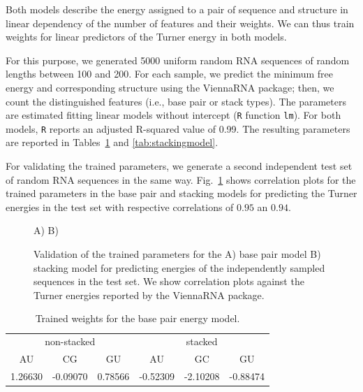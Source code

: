 \documentclass[10pt]{article}
\makeatletter
\newlength{\@aligneps}
\newcommand{\includegraphicstop}[2][]{%
\sbox{\@alignepsbox}{\texttt{[image: \#2]}}%
\setlength{\@aligneps}{-\ht\@alignepsbox}%
\addtolength{\@aligneps}{2ex}%
\raisebox{\@aligneps}{\usebox{\@alignepsbox}}}
\makeatother
\begin{document}
Both models describe the energy assigned to a pair of sequence and
structure in linear dependency of the number of features and their
weights. We can thus train weights for linear predictors of the Turner
energy in both models.

For this purpose, we generated 5000 uniform random RNA sequences of
random lengths between 100 and 200. For each sample, we predict the
minimum free energy and corresponding structure using the ViennaRNA
package; then, we count the distinguished features (i.e., base pair or
stack types). The parameters are estimated fitting linear models
without intercept (\texttt{R} function \texttt{lm}). For both models,
\texttt{R} reports an adjusted R-squared value of 0.99. The resulting
parameters are reported in Tables~\ref{tab:basepairmodel} and
\ref{tab:stackingmodel}.

For validating the trained parameters, we generate a second
independent test set of random RNA sequences in the same
way. Fig.~\ref{fig:training-cor} shows correlation plots for the
trained parameters in the base pair and stacking models for predicting
the Turner energies in the test set with respective correlations of
$0.95$ an $0.94$.

\begin{figure}
  \centering
  A)\includegraphicstop[width=0.4\textwidth,trim=0 0 0 50,clip]{Figs/basepaircor}
  B)\includegraphicstop[width=0.4\textwidth,trim=0 0 0 50,clip]{Figs/stackingcor}
  \caption{Validation of the trained parameters for the A) base pair
    model B) stacking model for predicting energies of the
    independently sampled sequences in the test set. We show
    correlation plots against the Turner energies reported by the
    ViennaRNA package.}
  \label{fig:training-cor}
\end{figure}

\begin{table}[b]
  \centering
  \caption{Trained weights for the base pair energy model.}
  \label{tab:basepairmodel}
  \begin{tabular}{c@{\quad}c@{\quad}c@{\quad}|@{\quad}c@{\quad}c@{\quad}c}
    \multicolumn{3}{c}{non-stacked} & \multicolumn{3}{c}{stacked}\\
    AU      & CG       & GU      & AU       & GC       & GU \\\hline
    1.26630 & -0.09070 & 0.78566 & -0.52309 & -2.10208 & -0.88474
  \end{tabular}
\end{table}

\end{document}
